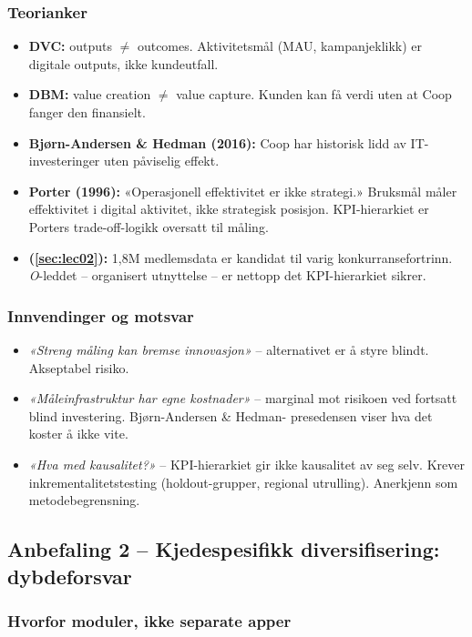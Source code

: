 \subsubsection*{Teorianker}
\begin{itemize}
  \item \textbf{DVC:} outputs $\neq$ outcomes. Aktivitetsmål (MAU,
    kampanjeklikk) er digitale outputs, ikke kundeutfall.
  \item \textbf{DBM:} value creation $\neq$ value capture. Kunden kan få
    verdi uten at Coop fanger den finansielt.
  \item \textbf{Bjørn-Andersen \& Hedman (2016):} Coop har historisk lidd
    av IT-investeringer uten påviselig effekt.
  \item \textbf{Porter (1996):} «Operasjonell effektivitet er ikke
    strategi.» Bruksmål måler effektivitet i digital aktivitet, ikke
    strategisk posisjon. KPI-hierarkiet er Porters trade-off-logikk
    oversatt til måling.
  \item \textbf{ (\autoref{sec:lec02}):} 1{,}8M medlemsdata er kandidat
    til varig konkurransefortrinn. \emph{O}-leddet -- organisert utnyttelse
    -- er nettopp det KPI-hierarkiet sikrer.
\end{itemize}

\subsubsection*{Innvendinger og motsvar}
\begin{itemize}
  \item \emph{«Streng måling kan bremse innovasjon»} -- alternativet er å
    styre blindt. Akseptabel risiko.
  \item \emph{«Måleinfrastruktur har egne kostnader»} -- marginal mot
    risikoen ved fortsatt blind investering. Bjørn-Andersen \& Hedman-
    presedensen viser hva det koster å ikke vite.
  \item \emph{«Hva med kausalitet?»} -- KPI-hierarkiet gir ikke kausalitet
    av seg selv. Krever inkrementalitetstesting (holdout-grupper, regional
    utrulling). Anerkjenn som metodebegrensning.
\end{itemize}

\subsection{Anbefaling 2 -- Kjedespesifikk diversifisering: dybdeforsvar}

\subsubsection*{Hvorfor moduler, ikke separate apper}

